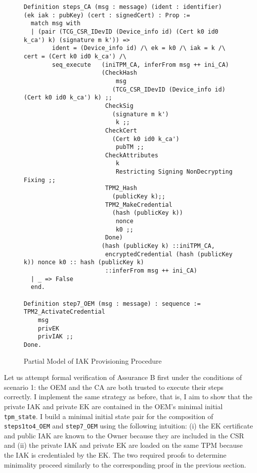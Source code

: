 \documentclass[runningheads]{llncs}
\begin{document}
\begin{figure}[hbtp]
\begin{lstlisting}[language=Coq]
Definition steps_CA (msg : message) (ident : identifier) (ek iak : pubKey) (cert : signedCert) : Prop :=
  match msg with
  | (pair (TCG_CSR_IDevID (Device_info id) (Cert k0 id0 k_ca') k) (signature m k')) =>
        ident = (Device_info id) /\ ek = k0 /\ iak = k /\ cert = (Cert k0 id0 k_ca') /\
        seq_execute   (iniTPM_CA, inferFrom msg ++ ini_CA)
                      (CheckHash 
                          msg 
                         (TCG_CSR_IDevID (Device_info id) (Cert k0 id0 k_ca') k) ;;
                       CheckSig 
                         (signature m k') 
                          k ;;
                       CheckCert 
                         (Cert k0 id0 k_ca') 
                          pubTM ;;
                       CheckAttributes 
                          k 
                          Restricting Signing NonDecrypting Fixing ;;
                       TPM2_Hash 
                         (publicKey k);;
                       TPM2_MakeCredential 
                         (hash (publicKey k))
                          nonce
                          k0 ;;
                       Done)
                      (hash (publicKey k) ::iniTPM_CA, 
                       encryptedCredential (hash (publicKey k)) nonce k0 :: hash (publicKey k) 
                       ::inferFrom msg ++ ini_CA)
  | _ => False
  end.

Definition step7_OEM (msg : message) : sequence :=
TPM2_ActivateCredential 
    msg 
    privEK 
    privIAK ;;
Done.
\end{lstlisting}
\caption{Partial Model of IAK Provisioning Procedure}
\label{fig:iak_model}
\end{figure}
\vspace{4em}

Let us attempt formal verification of Assurance B first under the conditions of scenario 1: the OEM and the CA are both trusted to execute their steps correctly. I implement the same strategy as before, that is, I aim to show that the private IAK and private EK are contained in the OEM's minimal initial \verb|tpm_state|. I build a minimal initial state pair for the composition of \verb|steps1to4_OEM| and \verb|step7_OEM| using the following intuition: (i) the EK certificate and public IAK are known to the Owner because they are included in the CSR and (ii) the private IAK and private EK are loaded on the same TPM because the IAK is credentialed by the EK. The two required proofs to determine minimality proceed similarly to the corresponding proof in the previous section.
\end{document}
